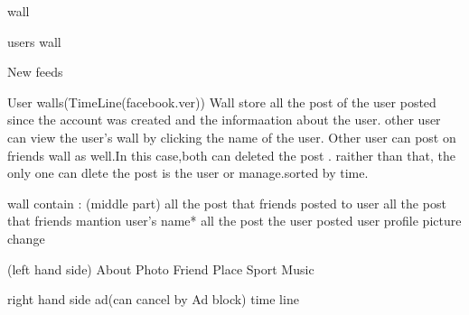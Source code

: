 wall

users wall

New feeds

User walls(TimeLine(facebook.ver))
Wall store all the post of the user posted since the account was created and the informaation about the user. other user can view the user's wall by clicking the name of the user. Other user can post on friends wall as well.In this case,both can deleted the post . raither than that, the only one can dlete the post is the user or manage.sorted by time.

wall contain :
(middle part)
all the post that friends posted to user
all the post that friends mantion user's name*
all the post the user posted
user profile picture change

(left hand side)
About
Photo
Friend
Place
Sport
Music

right hand side
ad(can cancel by Ad block)
time line